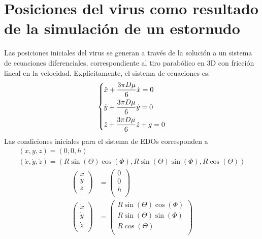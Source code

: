 \documentclass[11pt]{article}
\begin{document}
\section{Posiciones del virus como resultado de la simulación de un estornudo}
Las posiciones iniciales del virus se generan a través de la solución a un sistema de ecuaciones diferenciales, correspondiente al tiro parabólico en 3D con fricción lineal en la velocidad. Explícitamente, el sistema de ecuaciones es:
\begin{equation}
    \begin{dcases}
        \label{tiroParab}
        \ddot{x}+ \frac{3\pi D \mu}{6} \dot{x} = 0  \\ 
        \ddot{y}+\frac{3\pi D \mu}{6} \dot{y} = 0  \\ 
        \ddot{z}+\frac{3\pi D \mu}{6} \dot{z} + g = 0  \\ 
    \end{dcases}
\end{equation}
Las condiciones iniciales para el sistema de EDOs corresponden a
\begin{equation}
    \begin{gathered}
        \label{tiroParabCI}
        (x,y,z) = (0,0,h) \\
        (\dot{x},\dot{y},\dot{z}) = (R\sin(\Theta)\cos(\Phi),R\sin(\Theta)\sin(\Phi),R\cos(\Theta))
    \end{gathered}        
\end{equation}
\begin{equation}
        \label{tiroParabCI}
        \begin{aligned}
            \begin{pmatrix}
                        x \\
                        y \\
                        z \\
            \end{pmatrix} &= \begin{pmatrix}
                0 \\
                0 \\
                h \\
            \end{pmatrix}\\
             \begin{pmatrix}
                        \dot{x} \\
                        \dot{y} \\
                        \dot{z} \\
                    \end{pmatrix} &= \begin{pmatrix}
                        R\sin(\Theta)\cos(\Phi) \\
                        R\sin(\Theta)\sin(\Phi) \\
                        R\cos(\Theta) \\
                    \end{pmatrix}
            \end{aligned}    
\end{equation}
\end{document}
